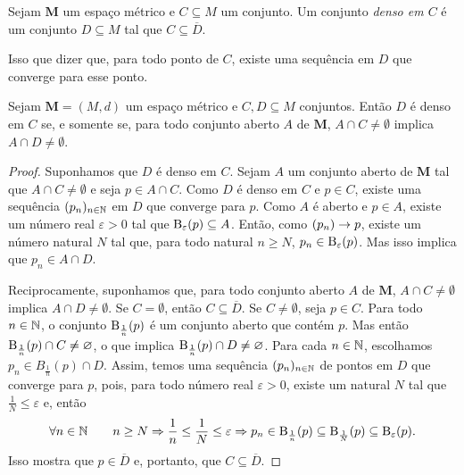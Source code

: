 \begin{defi}
	Sejam $\bm M$ um espaço métrico e $C \subseteq M$ um conjunto. Um conjunto \emph{denso em $C$} é um conjunto $D \subseteq M$ tal que $C \subseteq \overline D$.
\end{defi}

	Isso que dizer que, para todo ponto de $C$, existe uma sequência em $D$ que converge para esse ponto.
	
\begin{prop}
	Sejam $\bm M = (M,d)$ um espaço métrico e $C,D \subseteq M$ conjuntos. Então $D$ é denso em $C$ se, e somente se, para todo conjunto aberto $A$ de $\bm M$, $A \cap C \neq \emptyset$ implica $A \cap D \neq \emptyset$.
\end{prop}
\begin{proof}
	Suponhamos que $D$ é denso em $C$. Sejam $A$ um conjunto aberto de $\bm M$ tal que $A \cap C \neq \emptyset$ e seja $p \in A \cap C$. Como $D$ é denso em $C$ e $p \in C$, existe uma sequência $(p_n)_{n \in \mathbb{N}}$ em $D$ que converge para $p$. Como $A$ é aberto e $p \in A$, existe um número real $\varepsilon>0$ tal que $\mathrm{B}_\varepsilon(p) \subseteq A$. Então, como $(p_n) \rightarrow p$, existe um número natural $N$ tal que, para todo natural $n \geq N$, $p_n \in \mathrm{B}_\varepsilon(p)$. Mas isso implica que $p_n \in A \cap D$.
	
	Reciprocamente, suponhamos que, para todo conjunto aberto $A$ de $\bm M$, $A \cap C \neq \emptyset$ implica $A \cap D \neq \emptyset$. Se $C=\emptyset$, então $C \subseteq \overline D$. Se $C \neq \emptyset$, seja $p \in C$. Para todo $n \in \mathbb{N}$, o conjunto $\mathrm{B}_\frac{1}{n}(p)$ é um conjunto aberto que contém $p$. Mas então $\mathrm{B}_\frac{1}{n}(p) \cap C \neq \varnothing$, o que implica $\mathrm{B}_\frac{1}{n}(p) \cap D \neq \varnothing$. Para cada $n \in \mathbb{N}$, escolhamos $p_n \in B_\frac{1}{n}(p) \cap D$. Assim, temos uma sequência $(p_n)_{n \in \mathbb{N}}$ de pontos em $D$ que converge para $p$, pois, para todo número real $\varepsilon>0$, existe um natural $N$ tal que $\frac{1}{N} \leq \varepsilon$ e, então
	\begin{equation*}
	\forall n \in \mathbb{N} \qquad n \geq N \Rightarrow \frac{1}{n} \leq \frac{1}{N} \leq \varepsilon \Rightarrow p_n \in \mathrm{B}_\frac{1}{n}(p) \subseteq \mathrm{B}_\frac{1}{N}(p) \subseteq \mathrm{B}_\varepsilon(p).
	\end{equation*}
	Isso mostra que $p \in \overline D$ e, portanto, que $C \subseteq \overline D$.
\end{proof}

